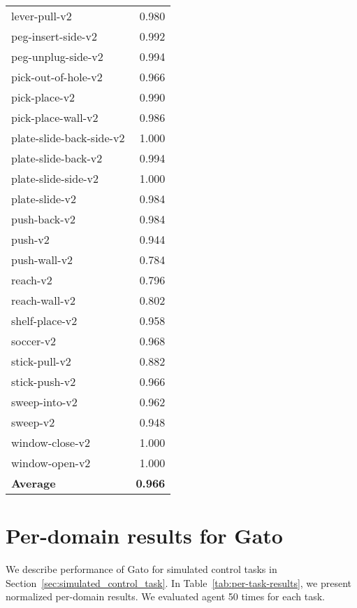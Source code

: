 \documentclass[10pt]{article} \usepackage[accepted]{tmlr}
\newcommand{\model}{{Gato}}
\begin{document}
\begin{table}[ht]
{\begin{tabular}{l|r}
    lever-pull-v2 & 0.980 \\
    peg-insert-side-v2 & 0.992 \\
    peg-unplug-side-v2 & 0.994 \\
    pick-out-of-hole-v2 & 0.966 \\
    pick-place-v2 & 0.990 \\
    pick-place-wall-v2 & 0.986 \\
    plate-slide-back-side-v2 & 1.000 \\
    plate-slide-back-v2 & 0.994 \\
    plate-slide-side-v2 & 1.000 \\
    plate-slide-v2 & 0.984 \\
    push-back-v2 & 0.984 \\
    push-v2 & 0.944 \\
    push-wall-v2 & 0.784 \\
    reach-v2 & 0.796 \\
    reach-wall-v2 & 0.802 \\
    shelf-place-v2 & 0.958 \\
    soccer-v2 & 0.968 \\
    stick-pull-v2 & 0.882 \\
    stick-push-v2 & 0.966 \\
    sweep-into-v2 & 0.962 \\
    sweep-v2 & 0.948 \\
    window-close-v2 & 1.000 \\
    window-open-v2 & 1.000 \\
    \midrule
    \textbf{Average} & \textbf{0.966} \\
    \bottomrule
    \end{tabular}}
\vspace{-0.7cm}
\end{table}

\newpage
\section{Per-domain results for \model{}}

We describe performance of \model{} for simulated control tasks in Section~\ref{sec:simulated_control_task}.
In Table~\ref{tab:per-task-results}, we present normalized per-domain results.
We evaluated agent 50 times for each task.
\end{document}
